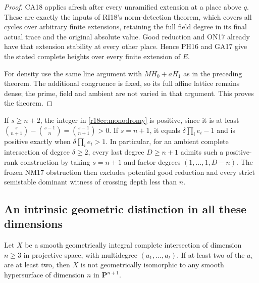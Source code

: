 \begin{proof}
CA18 applies afresh after every unramified
extension at a place above $q$.  These are
exactly the inputs of RI18's norm-detection
theorem, which covers all cycles over arbitrary
finite extensions, retaining the full field
degree in its final actual trace and the
original absolute value.  Good reduction and
ON17 already have that extension stability
at every other place.  Hence PH16 and GA17
give the stated complete heights over every
finite extension of $E$.

For density use the same line argument with
$MH_0+aH_1$ as in the preceding theorem.
The additional congruence is fixed, so its
full affine lattice remains dense; the prime,
field and ambient are not varied in that
argument.  This proves the theorem.
\end{proof}

If $s\ge n+2$, the integer in
\eqref{r18ce:monodromy} is positive, since it is at
least $\binom{s}{n+1}-\binom{s-1}{n}
=\binom{s-1}{n+1}>0$.
If $s=n+1$, it equals $\delta\prod_i e_i-1$
and is positive exactly when $\delta\prod_i e_i>1$.
In particular, for an ambient complete intersection
of degree $\delta\ge2$, every last degree
$D\ge n+1$ admits such a positive-rank construction
by taking $s=n+1$ and factor degrees
$(1,\ldots,1,D-n)$.
The frozen NM17 obstruction then excludes potential
good reduction and every strict semistable dominant
witness of crossing depth less than $n$.

\subsection{An intrinsic geometric distinction in all these dimensions}

\begin{proposition}
\label{r18ce:not-hypersurface}
Let $X$ be a smooth geometrically integral complete
intersection of dimension $n\ge3$ in projective
space, with multidegree $(a_1,\ldots,a_t)$.
If at least two of the $a_i$ are at least two,
then $X$ is not geometrically isomorphic to any
smooth hypersurface of dimension $n$ in
$\mathbf P^{n+1}$.
\end{proposition}

